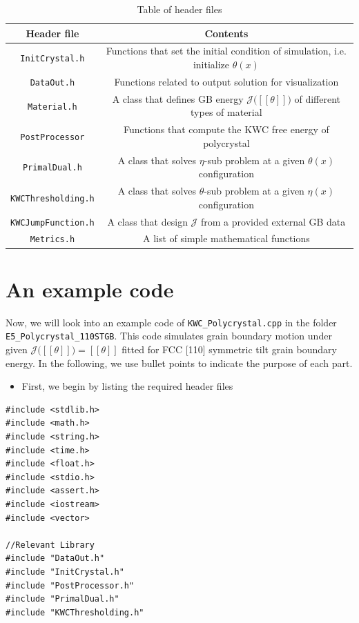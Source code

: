 \documentclass[11pt]{article}
\begin{document}
\begin{table}
\begin{center}
\begin{tabular}{cc} \toprule
Header file     & Contents \\ \midrule
\texttt{InitCrystal.h} & Functions that set the initial condition of simulation, i.e. initialize $\theta(x)$\\
\texttt{DataOut.h} & Functions related to output solution for visualization\\
\texttt{Material.h} & A class that defines GB energy $\mathcal{J}\big( [\![ \theta ]\!] \big)$ of different types of material \\
\texttt{PostProcessor} & Functions that compute the KWC free energy of polycrystal\\
\texttt{PrimalDual.h} & A class that solves $\eta$-sub problem at a given $\theta(x)$ configuration\\
\texttt{KWCThresholding.h} & A class that solves $\theta$-sub problem at a given $\eta(x)$ configuration\\
\texttt{KWCJumpFunction.h} & A class that design $\mathcal{J}$ from a provided external GB data \\
\texttt{Metrics.h} & A list of simple mathematical functions
\end{tabular}
\caption{Table of header files}
\label{tab:symbols}
\end{center}
\end{table}


\section{An example code}

Now, we will look into an example code of 
\texttt{KWC\_Polycrystal.cpp} in the folder \texttt{E5\_Polycrystal\_110STGB}.
This code simulates grain boundary motion under 
given $\mathcal{J}\big( [\![ \theta ]\!] \big)=[\![ \theta ]\!]$
fitted for FCC [110] symmetric tilt grain boundary energy. 
In the following, we use bullet points to indicate the purpose of each part. 

\begin{itemize} \item First, we begin by listing the required header files \end{itemize}
\begin{tcolorbox}
\begin{lstlisting}[basicstyle=\footnotesize]
#include <stdlib.h>
#include <math.h>
#include <string.h>
#include <time.h>
#include <float.h>
#include <stdio.h>
#include <assert.h>
#include <iostream>
#include <vector>

//Relevant Library
#include "DataOut.h"
#include "InitCrystal.h"
#include "PostProcessor.h"
#include "PrimalDual.h"
#include "KWCThresholding.h"
\end{lstlisting}
\end{tcolorbox}
\end{document}

